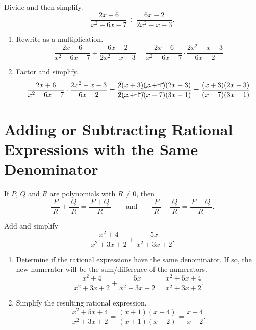 \documentclass[en,12pt]{elegantbook}
\providecommand{\tightlist}{%
  \setlength{\itemsep}{0pt}\setlength{\parskip}{0pt}}
\providecommand{\tightlist}{%
  \setlength{\itemsep}{0pt}\setlength{\parskip}{0pt}}
\let\BeginKnitrBlock\begin \let\EndKnitrBlock\end
\begin{document}
\BeginKnitrBlock{example}
\protect\hypertarget{exm:unnamed-chunk-40}{}{\label{exm:unnamed-chunk-40} }
Divide and then simplify.\\
\[
\dfrac{2x+6}{x^2-6x-7}\div \dfrac{6x-2}{2x^2-x-3}.
\]
\EndKnitrBlock{example}

\BeginKnitrBlock{solution}


\begin{enumerate}
\def\labelenumi{\arabic{enumi}.}
\tightlist
\item
  Rewrite as a multiplication.\\
  \[
  \dfrac{2x+6}{x^2-6x-7}\div \dfrac{6x-2}{2x^2-x-3}=\dfrac{2x+6}{x^2-6x-7}\cdot \dfrac{2x^2-x-3}{6x-2}
  \]
\item
  Factor and simplify.\\
  \[
  \dfrac{2x+6}{x^2-6x-7}\cdot\dfrac{2x^2-x-3}{6x-2}
  =\dfrac{\cancel{2}(x+3)\cancel{(x+1)}(2x-3)}{\cancel{2}\cancel{(x+1)}(x-7)(3x-1)}
  =\dfrac{(x+3)(2x-3)}{(x-7)(3x-1)}
  \]
\end{enumerate}
\EndKnitrBlock{solution}

\hypertarget{adding-or-subtracting-rational-expressions-with-the-same-denominator}{%
\section{Adding or Subtracting Rational Expressions with the Same Denominator}\label{adding-or-subtracting-rational-expressions-with-the-same-denominator}}

If \(P\), \(Q\) and \(R\) are polynomials with \(R\neq 0\), then
\[
\dfrac{~P~}{~R~}+\dfrac{~Q~}{~R~}=\dfrac{~P+Q~}{~R~}\qquad \text{and} \qquad
\dfrac{~P~}{~R~}-\dfrac{~Q~}{~R~}=\dfrac{~P-Q~}{~R~}.
\]

\BeginKnitrBlock{example}
\protect\hypertarget{exm:unnamed-chunk-42}{}{\label{exm:unnamed-chunk-42} }
Add and simplify\\
\[
\dfrac{x^2+4}{x^2+3x+2}+\dfrac{5x}{x^2+3x+2}.
\]
\EndKnitrBlock{example}

\BeginKnitrBlock{solution}


\begin{enumerate}
\def\labelenumi{\arabic{enumi}.}
\tightlist
\item
  Determine if the rational expressions have the same denominator. If so, the new numerator will be the sum/difference of the numerators.
  \[
   \dfrac{x^2+4}{x^2+3x+2}+\dfrac{5x}{x^2+3x+2}=\dfrac{x^2+5x+4}{x^2+3x+2}.
  \]
\item
  Simplify the resulting rational expression.
  \[
   \dfrac{x^2+5x+4}{x^2+3x+2}=\dfrac{(x+1)(x+4)}{(x+1)(x+2)}=\dfrac{x+4}{x+2}.
  \]
\end{enumerate}
\EndKnitrBlock{solution}
\end{document}
